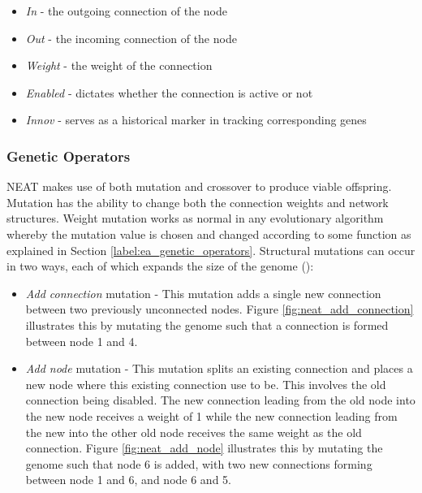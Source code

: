 \begin{itemize}
    \item \textit{In} - the outgoing connection of the node
    \item \textit{Out} - the incoming connection of the node
    \item \textit{Weight} - the weight of the connection
    \item \textit{Enabled} - dictates whether the connection is active or not\
    \item \textit{Innov} - serves as a historical marker in tracking corresponding genes
\end{itemize}

\subsubsection{Genetic Operators}
\noindent NEAT makes use of both mutation and crossover to produce viable offspring. Mutation has the ability to change both the connection weights and network structures. Weight mutation works as normal in any evolutionary algorithm whereby the mutation value is chosen and changed according to some function as explained in Section \ref{label:ea_genetic_operators}. Structural mutations can occur in two ways, each of which expands the size of the genome (\cite{stanley2002evolving}):
\begin{itemize}
    \item \textit{Add connection} mutation - This mutation adds a single new connection between two previously unconnected nodes. Figure \ref{fig:neat_add_connection} illustrates this by mutating the genome such that a connection is formed between node 1 and 4.
    \item \textit{Add node} mutation - This mutation splits an existing connection and places a new node where this existing connection use to be. This involves the old connection being disabled. The new connection leading from the old node into the new node receives a weight of 1 while the new connection leading from the new into the other old node receives the same weight as the old connection. Figure \ref{fig:neat_add_node} illustrates this by mutating the genome such that node 6 is added, with two new connections forming between node 1 and 6, and node 6 and 5.
\end{itemize}

